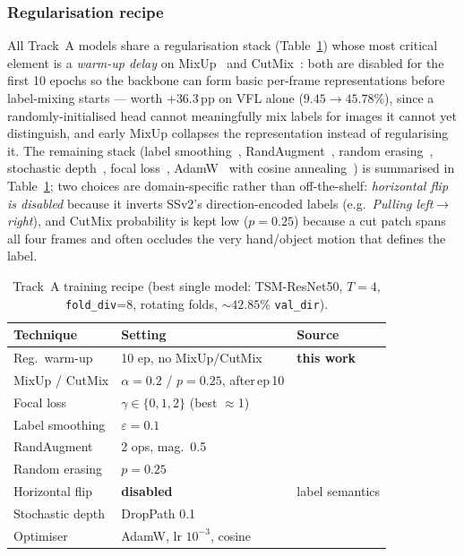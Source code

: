 \documentclass[10pt,twocolumn,letterpaper]{article}
\begin{document}
\subsubsection{Regularisation recipe}
All Track~A models share a regularisation stack (Table~\ref{tab:recipe}) whose
most critical element is a \emph{warm-up delay} on
MixUp~\cite{zhang2018mixup} and CutMix~\cite{yun2019cutmix}: both are disabled
for the first 10 epochs so the backbone can form basic per-frame
representations before label-mixing starts --- worth $+36.3$\,pp on VFL alone
($9.45\!\rightarrow\!45.78\%$), since a randomly-initialised head cannot
meaningfully mix labels for images it cannot yet distinguish, and early MixUp
collapses the representation instead of regularising it. The remaining stack
(label smoothing~\cite{muller2019labelsmooth},
RandAugment~\cite{cubuk2020randaugment},
random erasing~\cite{zhong2020randomerase},
stochastic depth~\cite{huang2016stochdepth}, focal
loss~\cite{lin2017focal}, AdamW~\cite{loshchilov2019adamw} with cosine
annealing~\cite{loshchilov2017sgdr}) is summarised in
Table~\ref{tab:recipe}; two choices are domain-specific rather than
off-the-shelf: \emph{horizontal flip is disabled} because it inverts SSv2's
direction-encoded labels (e.g.\ \emph{Pulling left$\rightarrow$right}), and
CutMix probability is kept low ($p{=}0.25$) because a cut patch spans all four
frames and often occludes the very hand/object motion that defines the label.

\begin{table}[t]
\centering\small
\setlength{\tabcolsep}{4pt}
\begin{tabular}{@{}lll@{}}
\toprule
Technique & Setting & Source \\
\midrule
Reg.\ warm-up      & 10 ep, no MixUp/CutMix & \textbf{this work} \\
MixUp / CutMix     & $\alpha{=}0.2$ / $p{=}0.25$, after\,ep\,10 & \cite{zhang2018mixup,yun2019cutmix} \\
Focal loss         & $\gamma{\in}\{0,1,2\}$ (best $\approx$1) & \cite{lin2017focal} \\
Label smoothing    & $\varepsilon{=}0.1$ & \cite{muller2019labelsmooth} \\
RandAugment        & 2 ops, mag.\ 0.5 & \cite{cubuk2020randaugment} \\
Random erasing     & $p{=}0.25$ & \cite{zhong2020randomerase} \\
Horizontal flip    & \textbf{disabled} & label semantics \\
Stochastic depth   & DropPath 0.1 & \cite{huang2016stochdepth} \\
Optimiser          & AdamW, lr $10^{-3}$, cosine & \cite{loshchilov2019adamw} \\
\bottomrule
\end{tabular}
\caption{Track~A training recipe (best single model: TSM-ResNet50, $T{=}4$,
\texttt{fold\_div}=8, rotating folds, ${\sim}42.85\%$ \texttt{val\_dir}).}
\label{tab:recipe}
\end{table}
\end{document}
